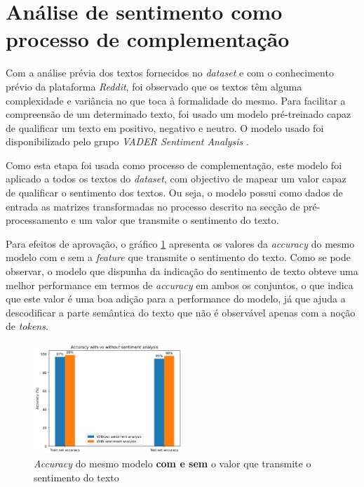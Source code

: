 \section{Análise de sentimento como processo de complementação}

Com a análise prévia dos textos fornecidos no \textit{dataset} e com o conhecimento prévio da plataforma \textit{Reddit}, foi observado que os textos têm alguma complexidade e variância no que toca à formalidade do mesmo.
Para facilitar a compreensão de um determinado texto, foi usado um modelo pré-treinado capaz de qualificar um texto em positivo, negativo e neutro. O modelo usado foi disponibilizado pelo grupo \textit{VADER Sentiment Analysis} \cite{vader}.

Como esta etapa foi usada como processo de complementação, este modelo foi aplicado a todos os textos do \textit{dataset}, com objectivo de mapear um valor capaz de qualificar o sentimento dos textos. Ou seja, o modelo possui como dados de entrada as matrizes transformadas no processo descrito na secção de pré-processamento e um valor que transmite o sentimento do texto.

Para efeitos de aprovação, o gráfico \ref{diagram:Sentiment_vs_no_sentiments} apresenta os valores da \textit{accuracy} do mesmo modelo com e sem a \textit{feature} que transmite o sentimento do texto. Como se pode observar, o modelo que dispunha da indicação do sentimento de texto obteve uma melhor performance em termos de \textit{accuracy} em ambos os conjuntos, o que indica que este valor é uma boa adição para a performance do modelo, já que ajuda a descodificar a parte semântica do texto que não é observável apenas com a noção de \textit{tokens}.


\begin{figure}[!t]
\begin{center}
\includegraphics[width=0.5\textwidth,keepaspectratio]{figures/sentiment_vs_no_sentiment.png}
\caption{\textit{Accuracy} do mesmo modelo \textbf{com e sem} o valor que transmite o sentimento do texto}
\label{diagram:Sentiment_vs_no_sentiments}
\centering
\end{center}
\end{figure}
